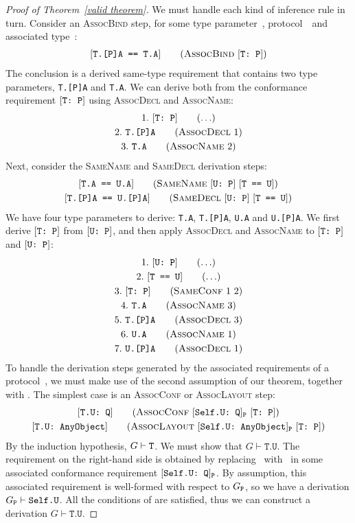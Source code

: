 \documentclass[../generics]{subfiles}
\begin{document}
\begin{proof}[Proof of Theorem~\ref*{valid theorem}]
\InductiveStep We must handle each kind of inference rule in turn. Consider an \textsc{AssocBind} step, for some type parameter~\tT, protocol~\tP\ and associated type~\nA:
\begin{gather*}
\AssocBindStepDef
\end{gather*}
The conclusion is a derived same-type requirement that contains two type parameters, \texttt{T.[P]A} and \texttt{T.A}. We can derive both from the conformance requirement $[\texttt{T:~P}]$ using \textsc{AssocDecl} and \textsc{AssocName}:
\begin{gather*}
\AnyStep{\TP}{1}\\
\AssocDeclStep{1}{T.[P]A}{2}\\
\AssocNameStep{2}{T.A}{3}
\end{gather*}
Next, consider the \textsc{SameName} and \textsc{SameDecl} derivation steps:
\begin{gather*}
\SameNameStepDef\\
\SameDeclStepDef
\end{gather*}
We have four type parameters to derive: \texttt{T.A}, \texttt{T.[P]A}, \texttt{U.A} and \texttt{U.[P]A}. We first derive $[\texttt{T:~P}]$ from $[\texttt{U:~P}]$, and then apply \textsc{AssocDecl} and \textsc{AssocName} to $[\texttt{T:~P}]$ and $[\texttt{U:~P}]$:
\begin{gather*}
\AnyStep{\ConfReq{U}{P}}{1}\\
\AnyStep{\TU}{2}\\
\SameConfStep{1}{2}{T}{P}{3}\\
\AssocNameStep{3}{T.A}{4}\\
\AssocDeclStep{3}{T.[P]A}{5}\\
\AssocNameStep{1}{U.A}{6}\\
\AssocDeclStep{1}{U.[P]A}{7}
\end{gather*}
To handle the derivation steps generated by the associated requirements of a protocol~\tP, we must make use of the second assumption of our theorem, together with . The simplest case is an \textsc{AssocConf} or \textsc{AssocLayout} step:
\begin{gather*}
\AssocConfStepDef\\
\AssocLayoutStepDef
\end{gather*}
By the induction hypothesis, $G\vdash\texttt{T}$. We must show that $G\vdash\texttt{T.U}$. The requirement on the right-hand side is obtained by replacing \tSelf\ with \tT\ in some associated conformance requirement $[\texttt{Self.U:~Q}]_{\texttt{P}}$. By assumption, this associated requirement is well-formed with respect to $G_{\texttt{P}}$, so we have a derivation $G_{\texttt{P}}\vdash\texttt{Self.U}$. All the conditions of  are satisfied, thus we can construct a derivation $G\vdash\texttt{T.U}$.


\end{proof}
\end{document}
